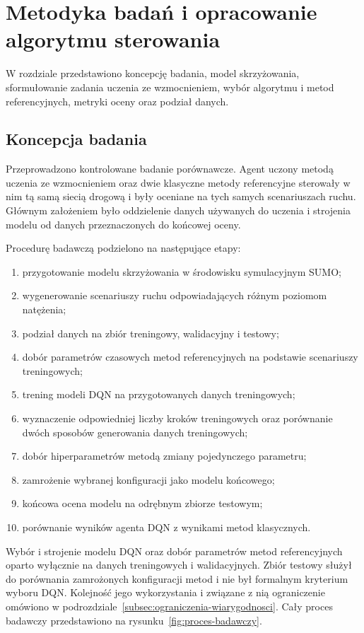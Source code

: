 \clearpage
\section{Metodyka badań i opracowanie algorytmu sterowania}
\label{sec:metodyka}

W rozdziale przedstawiono koncepcję badania, model skrzyżowania, sformułowanie zadania uczenia ze wzmocnieniem, wybór algorytmu i metod referencyjnych, metryki oceny oraz podział danych.

\subsection{Koncepcja badania}
\label{subsec:koncepcja}

Przeprowadzono kontrolowane badanie porównawcze. Agent uczony metodą uczenia ze wzmocnieniem oraz dwie klasyczne metody referencyjne sterowały w nim tą samą siecią drogową i były oceniane na tych samych scenariuszach ruchu. Głównym założeniem było oddzielenie danych używanych do uczenia i strojenia modelu od danych przeznaczonych do końcowej oceny.

Procedurę badawczą podzielono na następujące etapy:
\begin{enumerate}
    \item przygotowanie modelu skrzyżowania w środowisku symulacyjnym SUMO;
    \item wygenerowanie scenariuszy ruchu odpowiadających różnym poziomom natężenia;
    \item podział danych na zbiór treningowy, walidacyjny i testowy;
    \item dobór parametrów czasowych metod referencyjnych na podstawie scenariuszy treningowych;
    \item trening modeli DQN na przygotowanych danych treningowych;
    \item wyznaczenie odpowiedniej liczby kroków treningowych oraz porównanie dwóch sposobów generowania danych treningowych;
    \item dobór hiperparametrów metodą zmiany pojedynczego parametru;
    \item zamrożenie wybranej konfiguracji jako modelu końcowego;
    \item końcowa ocena modelu na odrębnym zbiorze testowym;
    \item porównanie wyników agenta DQN z wynikami metod klasycznych.
\end{enumerate}

Wybór i strojenie modelu DQN oraz dobór parametrów metod referencyjnych oparto wyłącznie na danych treningowych i walidacyjnych. Zbiór testowy służył do porównania zamrożonych konfiguracji metod i nie był formalnym kryterium wyboru DQN. Kolejność jego wykorzystania i związane z nią ograniczenie omówiono w podrozdziale~\ref{subsec:ograniczenia-wiarygodnosci}. Cały proces badawczy przedstawiono na rysunku~\ref{fig:proces-badawczy}.

